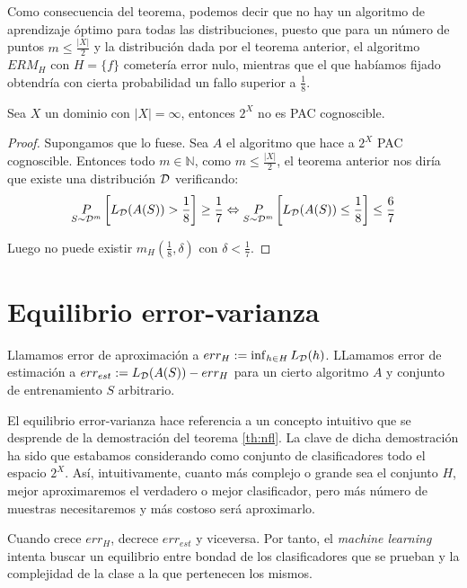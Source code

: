 Como consecuencia del teorema, podemos decir que no hay un algoritmo de aprendizaje óptimo para todas las 
distribuciones, puesto que para un número de puntos $m \le \frac{|X|}{2}$ y la distribución dada por el teorema
anterior, el algoritmo $ERM_H$ con $H = \{f\}$ cometería error nulo, mientras que el que habíamos fijado
obtendría con cierta probabilidad un fallo superior a $\frac{1}{8}$.

\begin{corollary}
 Sea $X$ un dominio con $|X| = \infty$, entonces $2^X$ no es PAC cognoscible.
 \label{cor:P(X)notpac}
\end{corollary}

\begin{proof}
 Supongamos que lo fuese. Sea $A$ el algoritmo que hace a $2^X$ PAC cognoscible. Entonces todo $m\in \mathbb{N}$, como 
 $m\le \frac{|X|}{2}$, el teorema anterior nos diría que existe una distribución $\mathcal{D}$ verificando: 
 \[
   \underset{S\sim \mathcal{D}^m}{P} \left[ L_{\mathcal{D}}(A(S)) > \frac{1}{8} \right] \ge \frac{1}{7} \Leftrightarrow 
   \underset{S\sim \mathcal{D}^m}{P} \left[ L_{\mathcal{D}}(A(S)) \le \frac{1}{8} \right] \le \frac{6}{7} 
 \]
 
 Luego no puede existir $m_H \left(\frac{1}{8}, \delta\right)$ con $\delta < \frac{1}{7}$.
\end{proof}


\section{Equilibrio error-varianza}
\begin{definition}
 Llamamos error de aproximación a $err_{H} := \inf_{h\in H} L_{\mathcal{D}}(h)$. LLamamos error de estimación a $err_{est} := 
 L_{\mathcal{D}} (A(S)) - err_{H}$ para un cierto algoritmo $A$ y conjunto de entrenamiento $S$ arbitrario.
\end{definition}

El equilibrio error-varianza hace referencia a un concepto intuitivo que se desprende de la demostración del teorema
\ref{th:nfl}. La clave de dicha demostración ha sido que estabamos considerando
como conjunto de clasificadores todo el espacio $2^X$. Así, intuitivamente, cuanto más complejo o grande sea el conjunto 
$H$, mejor aproximaremos el verdadero o mejor clasificador, pero más número de muestras necesitaremos y más costoso será
aproximarlo.

Cuando crece $err_{H}$, decrece $err_{est}$ y viceversa. Por tanto, el \emph{machine learning} intenta buscar un equilibrio
entre bondad de los clasificadores que se prueban y la complejidad de la clase a la que pertenecen los mismos.
